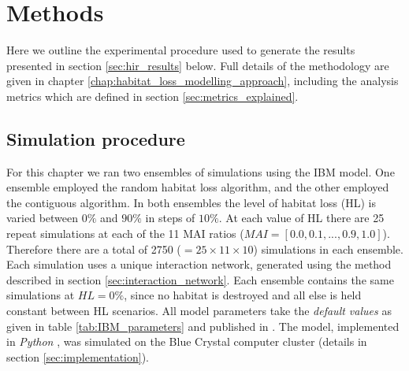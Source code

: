




\section{Methods}
\label{sec:methods}

Here we outline the experimental procedure used to generate the results presented in section \ref{sec:hir_results} below. Full details of the methodology are given in chapter \ref{chap:habitat_loss_modelling_approach}, including the analysis metrics which are defined in section \ref{sec:metrics_explained}. 

\subsection{Simulation procedure}
\label{sec:simulation_procedure}

For this chapter we ran two ensembles of simulations using the IBM model. One ensemble employed the random habitat loss algorithm, and the other employed the contiguous algorithm. In both ensembles the level of habitat loss (HL) is varied between $0\%$ and $90\%$ in steps of $10\%$. At each value of HL there are 25 repeat simulations at each of the 11 MAI ratios ($MAI=[0.0,0.1,...,0.9,1.0]$). Therefore there are a total of 2750 ($=25 \times 11 \times 10$) simulations in each ensemble. Each simulation uses a unique interaction network, generated using the method described in section \ref{sec:interaction_network}. Each ensemble contains the same simulations at $HL=0\%$, since no habitat is destroyed and all else is held constant between HL scenarios. All model parameters take the \emph{default values} as given in table \ref{tab:IBM_parameters} and published in \cite{lurgi2015effects}. The model, implemented in \emph{Python} \cite{python}, was simulated on the Blue Crystal computer cluster \cite{BC3} (details in section \ref{sec:implementation}).


